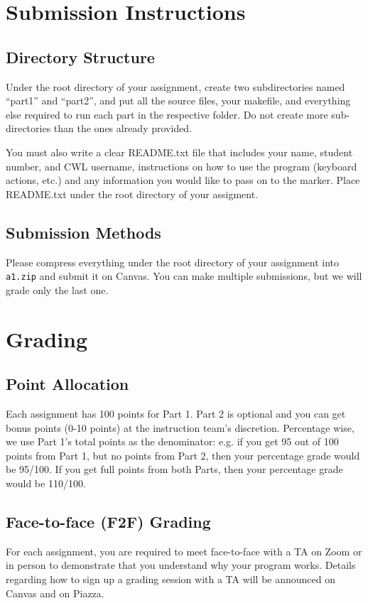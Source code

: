 \documentclass[12pt]{exam}
\begin{document}
\section{Submission Instructions}
\subsection{Directory Structure}
Under the root directory of your assignment, create two subdirectories
named ``part1'' and ``part2'', and put all the source files, your
makefile, and everything else required to run each part in the respective
folder. Do not create more sub-directories than the ones already provided. 

You must also write a clear README.txt file that includes your name,
student number, and CWL username, instructions on how to use the
program (keyboard actions, etc.) and any information you would like to
pass on to the marker. Place README.txt under the root directory of your
assigment.

\subsection{Submission Methods}
Please compress everything under the root directory of your assignment into
{\tt a1.zip} and submit it on Canvas. You can make multiple submissions,
but we will grade only the last one.

\section{Grading}
\subsection{Point Allocation}
Each assignment has 100 points for Part 1. Part 2 is optional and you can get bonus points (0-10 points) at the
instruction team's discretion.
Percentage wise, we use Part 1's total points as the denominator: e.g. if you
get 95 out of 100 points from Part 1, but no points from Part 2, then your percentage
grade would be 95/100. If you get full points from both Parts, then your percentage
grade would be 110/100.

\subsection{Face-to-face (F2F) Grading}
For each assignment, you are required to meet face-to-face with a TA on Zoom or in person
to demonstrate that you understand why your program works. Details regarding how to
sign up a grading session with a TA will be announced on Canvas and on Piazza.
\end{document}
